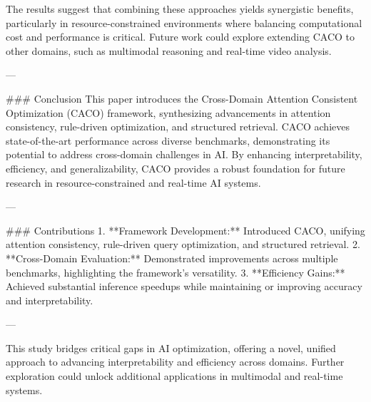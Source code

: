 The results suggest that combining these approaches yields synergistic benefits, particularly in resource-constrained environments where balancing computational cost and performance is critical. Future work could explore extending CACO to other domains, such as multimodal reasoning and real-time video analysis.

---

### Conclusion
This paper introduces the Cross-Domain Attention Consistent Optimization (CACO) framework, synthesizing advancements in attention consistency, rule-driven optimization, and structured retrieval. CACO achieves state-of-the-art performance across diverse benchmarks, demonstrating its potential to address cross-domain challenges in AI. By enhancing interpretability, efficiency, and generalizability, CACO provides a robust foundation for future research in resource-constrained and real-time AI systems.

---

### Contributions
1. **Framework Development:** Introduced CACO, unifying attention consistency, rule-driven query optimization, and structured retrieval.
2. **Cross-Domain Evaluation:** Demonstrated improvements across multiple benchmarks, highlighting the framework's versatility.
3. **Efficiency Gains:** Achieved substantial inference speedups while maintaining or improving accuracy and interpretability.

---

This study bridges critical gaps in AI optimization, offering a novel, unified approach to advancing interpretability and efficiency across domains. Further exploration could unlock additional applications in multimodal and real-time systems.